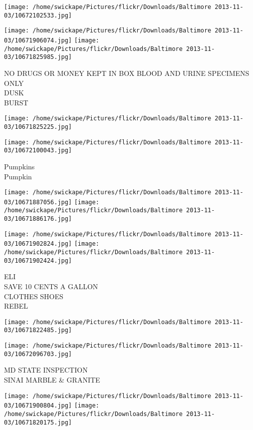 \documentclass[10pt,letterpaper]{article}
\begin{document}
\texttt{[image: /home/swickape/Pictures/flickr/Downloads/Baltimore 2013-11-03/10672102533.jpg]}

\vspace{0.25in}
\texttt{[image: /home/swickape/Pictures/flickr/Downloads/Baltimore 2013-11-03/10671906074.jpg]}
\texttt{[image: /home/swickape/Pictures/flickr/Downloads/Baltimore 2013-11-03/10671825985.jpg]}

NO DRUGS OR MONEY KEPT IN BOX BLOOD AND URINE SPECIMENS ONLY\\
DUSK\\
BURST
\pagebreak

\texttt{[image: /home/swickape/Pictures/flickr/Downloads/Baltimore 2013-11-03/10671825225.jpg]}

\vspace{0.25in}
\texttt{[image: /home/swickape/Pictures/flickr/Downloads/Baltimore 2013-11-03/10672100043.jpg]}

Pumpkins\\
Pumpkin
\pagebreak

\texttt{[image: /home/swickape/Pictures/flickr/Downloads/Baltimore 2013-11-03/10671887056.jpg]}
\texttt{[image: /home/swickape/Pictures/flickr/Downloads/Baltimore 2013-11-03/10671886176.jpg]}

\texttt{[image: /home/swickape/Pictures/flickr/Downloads/Baltimore 2013-11-03/10671902824.jpg]}
\texttt{[image: /home/swickape/Pictures/flickr/Downloads/Baltimore 2013-11-03/10671902424.jpg]}

ELI\\
SAVE 10 CENTS A GALLON\\
CLOTHES SHOES\\
REBEL
\pagebreak

\texttt{[image: /home/swickape/Pictures/flickr/Downloads/Baltimore 2013-11-03/10671822485.jpg]}

\vspace{0.25in}
\texttt{[image: /home/swickape/Pictures/flickr/Downloads/Baltimore 2013-11-03/10672096703.jpg]}

MD STATE INSPECTION\\
SINAI MARBLE \& GRANITE
\pagebreak

\texttt{[image: /home/swickape/Pictures/flickr/Downloads/Baltimore 2013-11-03/10671900804.jpg]}
\texttt{[image: /home/swickape/Pictures/flickr/Downloads/Baltimore 2013-11-03/10671820175.jpg]}
\end{document}
